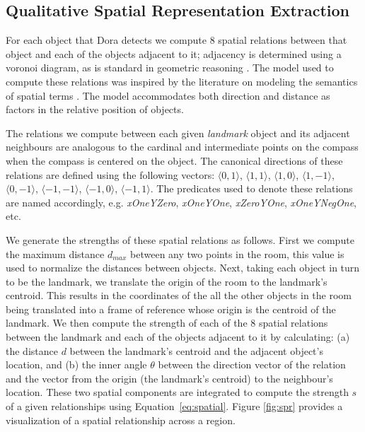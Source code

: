 \subsection{Qualitative Spatial Representation Extraction}

For each object that Dora detects we compute 8 spatial relations between that object and each of the objects adjacent to it; adjacency is determined using a voronoi diagram, as is standard in geometric reasoning \cite{Forbus/etal2003}. The model used to compute these relations was inspired by the literature on modeling the semantics of spatial terms \cite{kelleher/costello:09,kelleher/vanGenabith:2006,regier/carlson:2001,gapp:1994}. The model accommodates both direction and distance as factors in the relative position of objects. 

The relations we compute between each given \emph{landmark} object and its adjacent neighbours are analogous to the cardinal and intermediate points on the compass when the compass is centered on the object. The canonical directions of these relations are defined using the following vectors: $\langle0,1\rangle$, $\langle1,1\rangle$, $\langle1,0\rangle$, $\langle1,-1\rangle$, $\langle0,-1\rangle$, $\langle-1,-1\rangle$, $\langle-1,0\rangle$, $\langle-1,1\rangle$. The predicates used to denote these relations are named accordingly, e.g. \textit{xOneYZero}, \textit{xOneYOne}, \textit{xZeroYOne}, \textit{xOneYNegOne}, etc.

We generate the strengths of these spatial relations as follows. First we compute the maximum distance $d_{max}$ between any two points in the room, this value is used to normalize the distances between objects. Next, taking each object in turn to be the landmark, we translate the origin of the room to the landmark's centroid. This results in the coordinates of the all the other objects in the room being translated into a frame of reference whose origin is the centroid of the landmark.  We then compute the strength of each of the 8 spatial relations between the landmark and each of the objects adjacent to it by calculating: (a) the distance $d$ between the landmark's centroid and the adjacent object's location, and (b) the inner angle $\theta$ between the direction vector of the relation and the vector from the origin (the landmark's centroid) to the neighbour's location. These two spatial components are integrated to compute the strength $s$ of a given relationships using Equation~\ref{eq:spatial}. Figure \ref{fig:spr} provides a visualization of a spatial relationship across a region. 

